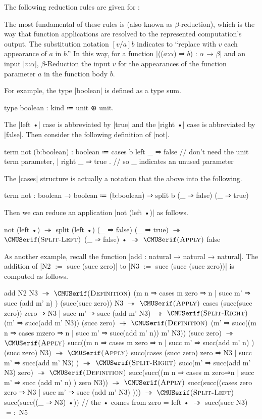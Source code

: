 The following reduction rules are given for \LangA:
%


The most fundamental of these rules is  (also known as $β$-reduction),
which is the way that function applications are resolved to
the represented computation's output.
The substitution notation $[v/a]b$ indicates to
``replace with $v$ each appearance of $a$ in $b$.''
In this way, for a function \code|(($a$:$α$) ⇒ $b$) : $α$ → $β$| and
an input \code|$v$:$α$|,
$β$-Reduction  the input $v$ for the appearances of the function parameter $a$ in the function body $b$.

For example, the type \code|boolean| is defined as a type sum.
%
\begin{snippet}
type boolean : kind ≔ unit ⊕ unit.
\end{snippet}
The \code|left •| case is abbreviated by \code|true| and the \code|right •| case is abbreviated by \code|false|.
Then consider the following definition of \code|not|.
%
\begin{snippet}
term not (b:boolean) : boolean
  ≔ cases b
      { left  _ ⇒ false   // don't need the unit term parameter,
      | right _ ⇒ true }. // so _ indicates an unused parameter
\end{snippet}
%
The \code|cases| structure is actually a notation that the above into the following.
%
\begin{snippet}
term not : boolean → boolean
  ≔ (b:boolean) ⇒ split b (_ ⇒ false) (_ ⇒ true)
\end{snippet}
%
Then we can reduce an application \code|not (left •)| as follows.
%
\begin{snippet}
not (left •)
$↠$
split (left •) (_ ⇒ false) (_ ⇒ true)
$↠$ $\ruleapp{Split-Left}$
(_ ⇒ false) •
$↠$ $\ruleapp{Apply}$
false
\end{snippet}

As another example, recall the function \code|add : natural → natural → natural|.
The addition of \code|N2 $:=$ succ (succ zero)| to \code|N3 $:=$ succ (succ (succ zero))| is computed as follows.
%
\begin{snippet}
add N2 N3
$↠$ $\ruleapp{Definition}$
(m n ⇒ cases m{ zero ⇒ n | succ m' ⇒ succ (add m' n) })
  (succ(succ zero)) N3
$↠$ $\ruleapp{Apply}$
cases (succ(succ zero)){ zero ⇒ N3 | succ m' ⇒ succ (add m' N3) }
$↠$ $\ruleapp{Split-Right}$
(m' ⇒ succ(add m' N3)) (succ zero)
$↠$ $\ruleapp{Definition}$
(m' ⇒ succ((m n ⇒ cases m{zero ⇒ n | succ m' ⇒ succ(add m' n)}) m' N3))
  (succ zero)
$↠$ $\ruleapp{Apply}$
succ((m n ⇒ cases m{ zero ⇒ n | succ m' ⇒ succ(add m' n) }) (succ zero) N3)
$↠$ $\ruleapp{Apply}$
succ(cases (succ zero){ zero ⇒ N3 | succ m' ⇒ succ(add m' N3) })
$↠$ $\ruleapp{Split-Right}$
succ(m' ⇒ succ(add m' N3) zero)
$↠$ $\ruleapp{Definition}$
succ(succ((m n ⇒ cases m{ zero⇒n | succ m' ⇒ succ (add m' n) }) zero N3))
$↠$ $\ruleapp{Apply}$
succ(succ((cases zero{ zero ⇒ N3 | succ m' ⇒ succ (add m' N3) })))
$↠$ $\ruleapp{Split-Left}$
succ(succ((_ ⇒ N3) •)) // the • comes from zero = left •
$↠$
succ(succ N3)
$=:$
N5
\end{snippet}

